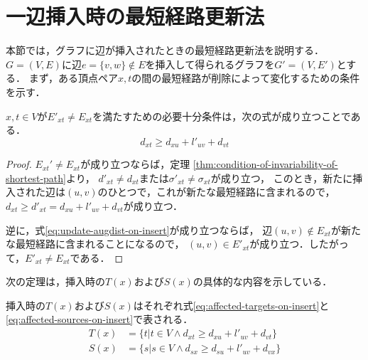 \section{一辺挿入時の最短経路更新法}
\label{sect:update-apsp-on-insert}
本節では，グラフに辺が挿入されたときの最短経路更新法を説明する．
$G=(V,E)$に辺$e=\{v,w\} \not\in E$を挿入して得られるグラフを$G'=(V,E')$とする．
まず，ある頂点ペア$x,t$の間の最短経路が削除によって変化するための条件を示す．

\begin{lemma}
  \label{lmm:update-augdist-on-insert}
  $x,t\in V$が$E'_{xt}\neq E_{xt}$を満たすための必要十分条件は，次の式が成り立つことである．
  \begin{equation}
    d_{xt}\geq d_{xu}+l'_{uv}+d_{vt}
    \label{eq:update-augdist-on-insert}
  \end{equation}
\end{lemma}
\begin{proof}
  $E_{xt}'\neq E_{xt}$が成り立つならば，定理
  \ref{thm:condition-of-invariability-of-shortest-path}より，
  $d'_{xt}\neq d_{xt}$または$\sigma'_{xt}\neq\sigma_{xt}$が成り立つ，
  このとき，新たに挿入された辺は$(u,v)$のひとつで，これが新たな最短経路に含まれるので，
  $d_{xt}\geq d'_{xt}=d_{xu}+l'_{uv}+d_{vt}$が成り立つ．

  逆に，式\eqref{eq:update-augdist-on-insert}が成り立つならば，
  辺$(u,v)\notin E_{xt}$が新たな最短経路に含まれることになるので，
  $(u,v)\in E'_{xt}$が成り立つ．したがって，$E'_{xt}\neq E_{xt}$である．
\end{proof}

次の定理は，挿入時の$T(x)$および$S(x)$の具体的な内容を示している．
\begin{theorem}
  \label{thm:affected-vertices-on-insert}
  挿入時の$T(x)$および$S(x)$はそれぞれ式\eqref{eq:affected-targets-on-insert}と
  \eqref{eq:affected-sources-on-insert}で表される．
  \begin{align}
    T(x)&=\{t|t\in V\land d_{xt}\geq d_{xu}+l'_{uv}+d_{vt}\}
    \label{eq:affected-targets-on-insert} \\
    S(x)&=\{s|s\in V\land d_{sx}\geq d_{su}+l'_{uv}+d_{vx}\}
    \label{eq:affected-sources-on-insert}
  \end{align}
\end{theorem}

